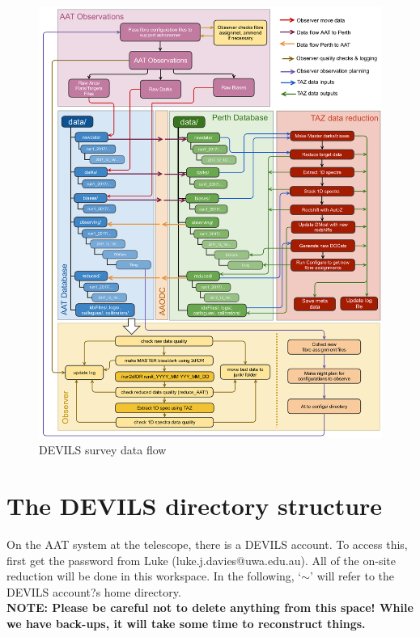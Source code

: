 \documentclass[12pt]{article}
\begin{document}
     

\begin{figure}
\begin{center}
\includegraphics[scale=0.17]{devils_taz_dataflow.png}
\caption{DEVILS survey data flow}
\label{fig:dataflow}
\end{center}
\end{figure}


\section{The DEVILS directory structure}


On the AAT system at the telescope, there is a DEVILS account. To access this, first get the password from Luke (luke.j.davies@uwa.edu.au). All of the on-site reduction will be done in this workspace. In the following, `$\sim$' will refer to the DEVILS account?s home directory.\\

\textcolor{PineGreen}{\textbf{NOTE: Please be careful not to delete anything from this space! While we have back-ups, it will take some time to reconstruct things.}}\\
\end{document}
